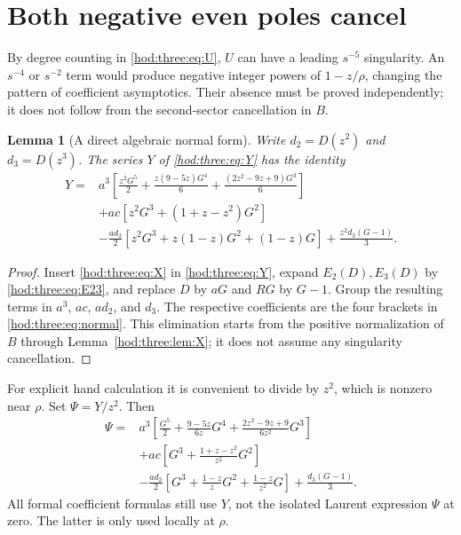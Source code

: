 \documentclass[11pt,letterpaper]{article}
\newtheorem{lemma}[theorem]{Lemma}
\theoremstyle{definition}\newtheorem{definition}[theorem]{Definition}
\theoremstyle{remark}\newtheorem{remark}[theorem]{Remark}
\begin{document}
\section{Both negative even poles cancel}\label{hod:three:sec:poles}
By degree counting in \eqref{hod:three:eq:U}, $U$ can have a leading $s^{-5}$ singularity. An $s^{-4}$ or $s^{-2}$ term would produce negative integer powers of $1-z/\rho$, changing the pattern of coefficient asymptotics. Their absence must be proved independently; it does not follow from the second-sector cancellation in $B$.

\begin{lemma}[A direct algebraic normal form]\label{hod:three:lem:normal}
Write $d_2=D(z^2)$ and $d_3=D(z^3)$. The series $Y$ of \eqref{hod:three:eq:Y} has the identity
\begin{equation}\label{hod:three:eq:normal}
\begin{split}
Y={}&a^3\left[\frac{z^2G^5}{2}+\frac{z(9-5z)G^4}{6}
+\frac{(2z^2-9z+9)G^3}{6}\right]\\
&+ac\left[z^2G^3+(1+z-z^2)G^2\right]\\
&-\frac{ad_2}{2}\left[z^2G^3+z(1-z)G^2+(1-z)G\right]
+\frac{z^2d_3(G-1)}3.
\end{split}
\end{equation}
\end{lemma}
\begin{proof}
Insert \eqref{hod:three:eq:X} in \eqref{hod:three:eq:Y}, expand $E_2(D),E_3(D)$ by \eqref{hod:three:eq:E23}, and replace $D$ by $aG$ and $RG$ by $G-1$. Group the resulting terms in $a^3$, $ac$, $ad_2$, and $d_3$. The respective coefficients are the four brackets in \eqref{hod:three:eq:normal}. This elimination starts from the positive normalization of $B$ through Lemma~\ref{hod:three:lem:X}; it does not assume any singularity cancellation.
\end{proof}
For explicit hand calculation it is convenient to divide by $z^2$, which is nonzero near $\rho$. Set $\Psi=Y/z^2$. Then
\begin{equation}\label{hod:three:eq:psi}
\begin{split}
\Psi={}&a^3\left[\frac{G^5}{2}+\frac{9-5z}{6z}G^4
+\frac{2z^2-9z+9}{6z^2}G^3\right]\\
&+ac\left[G^3+\frac{1+z-z^2}{z^2}G^2\right]\\
&-\frac{ad_2}{2}\left[G^3+\frac{1-z}{z}G^2+\frac{1-z}{z^2}G\right]
+\frac{d_3(G-1)}3.
\end{split}
\end{equation}
All formal coefficient formulas still use $Y$, not the isolated Laurent expression $\Psi$ at zero. The latter is only used locally at $\rho$.
\end{document}
